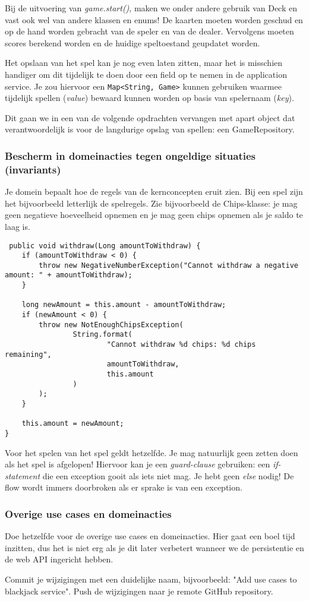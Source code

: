 Bij de uitvoering van \textit{game.start()}, maken we onder andere gebruik van 
Deck en vast ook wel van andere klassen en enums! 
De kaarten moeten worden geschud en op de hand worden gebracht van de speler 
en van de dealer. Vervolgens moeten scores berekend worden en de huidige speltoestand 
geupdatet worden.

Het opslaan van het spel kan je nog even laten zitten,
maar het is misschien handiger om dit tijdelijk te doen 
door een field op te nemen in de application service.
Je zou hiervoor een \texttt{Map<String, Game>} kunnen gebruiken 
waarmee tijdelijk spellen (\textit{value}) bewaard kunnen worden 
op basis van spelernaam (\textit{key}).

Dit gaan we in een van de volgende opdrachten vervangen met apart object dat verantwoordelijk 
is voor de langdurige opslag van spellen: een GameRepository.

\subsubsection{Bescherm in domeinacties tegen ongeldige situaties (invariants)}
Je domein bepaalt hoe de regels van de kernconcepten eruit zien.
Bij een spel zijn het bijvoorbeeld letterlijk de spelregels.
Zie bijvoorbeeld de Chips-klasse: je mag geen negatieve hoeveelheid opnemen 
en je mag geen chips opnemen als je saldo te laag is.

\begin{verbatim}
 public void withdraw(Long amountToWithdraw) {
    if (amountToWithdraw < 0) {
        throw new NegativeNumberException("Cannot withdraw a negative amount: " + amountToWithdraw);
    }

    long newAmount = this.amount - amountToWithdraw;
    if (newAmount < 0) {
        throw new NotEnoughChipsException(
                String.format(
                        "Cannot withdraw %d chips: %d chips remaining",
                        amountToWithdraw,
                        this.amount
                )
        );
    }

    this.amount = newAmount;
}    
\end{verbatim}

Voor het spelen van het spel geldt hetzelfde. Je mag natuurlijk 
geen zetten doen als het spel is afgelopen! Hiervoor kan je een \textit{guard-clause} gebruiken:
een \textit{if-statement} die een exception gooit als iets niet mag. Je hebt geen \textit{else} nodig! 
De flow wordt immers doorbroken als er sprake is van een exception.

\subsubsection{Overige use cases en domeinacties}
Doe hetzelfde voor de overige use cases en domeinacties. 
Hier gaat een boel tijd inzitten, 
dus het is niet erg als je dit later verbetert wanneer we 
de persistentie en de web API ingericht hebben.

Commit je wijzigingen met een duidelijke naam, 
bijvoorbeeld: "Add use cases to blackjack service". 
Push de wijzigingen naar je remote GitHub repository.